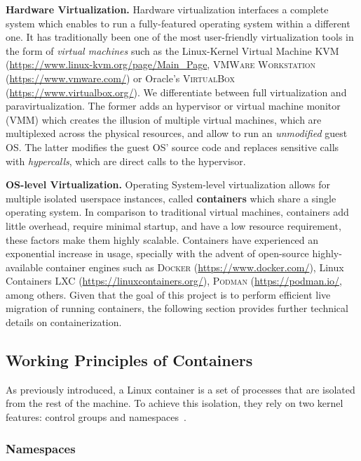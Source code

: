 \textbf{Hardware Virtualization.}
Hardware virtualization interfaces a complete system which enables to run a fully-featured operating system within a different one.
It has traditionally been one of the most user-friendly virtualization tools in the form of \emph{virtual machines} such as the Linux-Kernel Virtual Machine \textsc{KVM} (\url{https://www.linux-kvm.org/page/Main_Page}, \textsc{VMWare Workstation} (\url{https://www.vmware.com/}) or Oracle's \textsc{VirtualBox} (\url{https://www.virtualbox.org/}).
We differentiate between full virtualization and paravirtualization.
The former adds an hypervisor or virtual machine monitor (VMM) which creates the illusion of multiple virtual machines, which are multiplexed across the physical resources, and allow to run an \emph{unmodified} guest OS.
The latter modifies the guest OS' source code and replaces sensitive calls with \emph{hypercalls}, which are direct calls to the hypervisor.

\textbf{OS-level Virtualization.}
Operating System-level virtualization allows for multiple isolated userspace instances, called \textbf{containers} which share a single operating system.
In comparison to traditional virtual machines, containers add little overhead, require minimal startup, and have a low resource requirement, these factors make them highly scalable.
Containers have experienced an exponential increase in usage, specially with the advent of open-source highly-available container engines such as \textsc{Docker} (\url{https://www.docker.com/}), Linux Containers \textsc{LXC} (\url{https://linuxcontainers.org/}), \textsc{Podman} (\url{https://podman.io/}, among others.
Given that the goal of this project is to perform efficient live migration of running containers, the following section provides further technical details on containerization.

\subsection{Working Principles of Containers}

As previously introduced, a Linux container is a set of processes that are isolated from the rest of the machine.
To achieve this isolation, they rely on two kernel features: control groups and namespaces~\cite{namespaces-manual}.

\subsubsection*{Namespaces}

